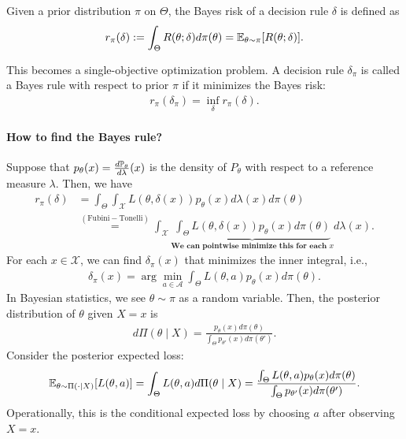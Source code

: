 \documentclass[11pt,letterpaper]{article}
\begin{document}
\begin{definition}
  Given a prior distribution $\pi$ on $\Theta$, the Bayes risk of a decision rule $\delta$ is defined as
  \begin{align*}
    r_\pi (\delta) := \int_\Theta R (\theta; \delta) d\pi(\theta) = {\mathbb{E}}_{\theta \sim \pi} [R (\theta; \delta)].
  \end{align*}
\end{definition}
This becomes a single-objective optimization problem. A decision rule $\delta_\pi$ is called a Bayes rule with respect to prior $\pi$ if it minimizes the Bayes risk:
\begin{align*}
  r_\pi (\delta_\pi) = \inf_{\delta} r_\pi (\delta).
\end{align*}

\paragraph{How to find the Bayes rule?} Suppose that $p_\theta (x) = \frac{d {\mathbb{P}}_\theta}{ d \lambda} (x)$ is the density of $P_\theta$ with respect to a reference measure $\lambda$. Then, we have
\begin{align*}
  r_\pi (\delta) &= \int_\Theta \int_\mathcal{X} L(\theta, \delta(x)) p_\theta (x) d\lambda(x) d\pi(\theta)\\
  &\stackrel{\mathrm{(Fubini-Tonelli)}}{=} \int_\mathcal{X} \underbrace{\int_\Theta L(\theta, \delta(x)) p_\theta (x) d\pi(\theta)}_{\textbf{We can pointwise minimize this for each $x$}} d\lambda(x).
\end{align*}
For each $x \in \mathcal{X}$, we can find $\delta_\pi(x)$ that minimizes the inner integral, i.e.,
\begin{align}
  \delta_\pi(x) = \arg\min_{a \in \mathcal{A}} \int_\Theta L(\theta, a) p_\theta (x) d\pi(\theta).\label{eq:bayes-rule-ptwise-minimization}
\end{align}
In Bayesian statistics, we see $\theta \sim \pi$ as a random variable. Then, the posterior distribution of $\theta$ given $X = x$ is
\begin{align*}
 d \Pi (\theta \mid X) = \frac{p_\theta (x) d\pi(\theta)}{\int_\Theta p_{\theta'} (x) d\pi(\theta')}.
\end{align*}
Consider the posterior expected loss:
\begin{align*}
  {\mathbb{E}}_{\theta \sim \Pi(\cdot \mid X)} [L(\theta, a)] = \int_\Theta L(\theta, a) d\Pi (\theta \mid X) = \frac{\int_\Theta L(\theta, a) p_\theta (x) d\pi(\theta)}{\int_\Theta p_{\theta'} (x) d\pi(\theta')}.
\end{align*}
Operationally, this is the conditional expected loss by choosing $a$ after observing $X = x$.
\end{document}
